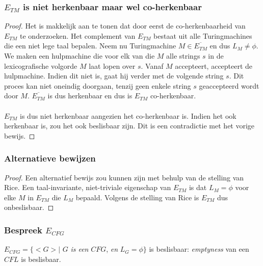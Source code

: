 \subsubsection*{$E_{TM}$ is niet herkenbaar maar wel co-herkenbaar}

\begin{proof}
	Het is makkelijk aan te tonen dat door eerst de co-herkenbaarheid van $E_{TM}$ te onderzoeken. Het complement van $E_{TM}$ bestaat uit alle Turingmachines die een niet lege taal bepalen. Neem nu Turingmachine $M \in \overline{E_{TM}}$ en dus $L_M \neq \phi$. We maken een hulpmachine die voor elk van die $M$ alle strings $s$ in de lexicografische volgorde $M$ laat lopen over $s$. Vanaf $M$ accepteert, accepteert de hulpmachine. Indien dit niet is, gaat hij verder met de volgende string $s$.
	Dit proces kan niet oneindig doorgaan, tenzij geen enkele string $s$ geaccepteerd wordt door $M$. $\overline{E_{TM}}$ is dus herkenbaar en dus is $E_{TM}$ co-herkenbaar.
	\\\\
	$E_{TM}$ is dus niet herkenbaar aangezien het co-herkenbaar is. Indien het ook herkenbaar is, zou het ook beslisbaar zijn. Dit is een contradictie met het vorige bewijs.
\end{proof}

\subsubsection*{Alternatieve bewijzen}

\begin{proof}
	Een alternatief bewijs zou kunnen zijn met behulp van de stelling van Rice. Een taal-invariante, niet-triviale eigenschap van $E_{TM}$ is dat $L_M = \phi$ voor elke $M$ in $E_{TM}$ die $L_M$ bepaald. Volgens de stelling van Rice is $E_{TM}$ dus onbeslisbaar.
\end{proof}

\subsubsection*{Bespreek $E_{CFG}$}

\begin{theorem}
	$E_{CFG} = \{ <G> |$ $G$ \textit{is een} $CFG$, \textit{en} $L_G = \phi \}$ is beslisbaar: \textit{emptyness} van een $CFL$ is beslisbaar.
\end{theorem}

